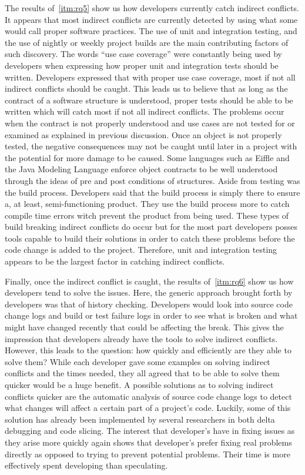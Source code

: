 \documentclass[conference]{IEEEtran}
\begin{document}
The results of~\ref{itm:rq5} show us how developers currently catch indirect conflicts. It appears that most indirect conflicts are currently
detected by using what some would call proper software practices. The use of unit and integration testing, and the use of nightly or weekly
project builds are the main contributing factors of such discovery. The words ``use case coverage'' were constantly being used by developers
when expressing how proper unit and integration tests should be written. Developers expressed that with proper use case coverage, most if
not all indirect conflicts should be caught. This leads us to believe that as long as the contract of a software structure is understood,
proper tests should be able to be written which will catch most if not all indirect conflicts. The problems occur when the contract is
not properly understood and use cases are not tested for or examined as explained in previous discussion. Once an object is not properly
tested, the negative consequences may not be caught until later in a project with the potential for more damage to be caused. Some languages
such as Eiffle and the Java Modeling Language enforce object contracts to be well understood through the ideas of pre and post conditions
of structures. Aside from testing
was the build process. Developers said that the build process is simply there to ensure a, at least, semi-functioning product. They use
the build process more to catch compile time errors witch prevent the product from being used. These types of build breaking indirect
conflicts do occur but for the most part developers posses tools capable to build their solutions in order to catch these problems before
the code change is added to the project. Therefore, unit and integration testing appears to be the largest factor in catching indirect conflicts.

Finally, once the indirect conflict is caught, the results of~\ref{itm:rq6} show us how developers tend to solve the issues. Here, the generic approach
brought forth by developers was that of history checking. Developers would look into source code change logs and build or test failure
logs in order to see what is broken and what might have changed recently that could be affecting the break. This gives the impression that
developers already have the tools to solve indirect conflicts. However, this leads to the question: how quickly and
efficiently are they able to solve them?
While each developer gave some examples on solving indirect conflicts and the times needed, they all agreed that to be able to solve them
quicker would be a huge benefit. A possible solutions as to solving indirect conflicts quicker are the automatic analysis of source code
change logs to detect what changes will affect a certain part of a project's code. Luckily, some of this solution has already been implemented
by several researchers in both delta debugging and code slicing. The interest that developer's have in fixing issues as they
arise more quickly again shows that developer's prefer fixing real problems directly as opposed to trying to prevent potential problems.
Their time is more effectively spent developing than speculating. 
\end{document}
